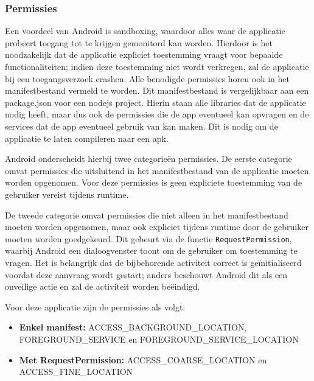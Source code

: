 \subsubsection{Permissies}
Een voordeel van Android is sandboxing, waardoor alles waar de applicatie probeert toegang tot te krijgen gemonitord kan worden. 
Hierdoor is het noodzakelijk dat de applicatie expliciet toestemming vraagt voor bepaalde functionaliteiten; indien deze toestemming niet wordt verkregen, zal de applicatie bij een toegangsverzoek crashen. Alle benodigde permissies horen ook in het manifestbestand vermeld te worden.
Dit manifestbestand is vergelijkbaar aan een package.json voor een nodejs project. Hierin staan alle libraries dat de applicatie nodig heeft, maar dus ook de permissies die de app eventueel kan opvragen en de services dat de app eventueel gebruik van kan maken. Dit is nodig om de applicatie te laten compileren naar een \gls{apk}.

Android onderscheidt hierbij twee categorieën permissies. 
De eerste categorie omvat permissies die uitsluitend in het manifestbestand van de applicatie moeten worden opgenomen. Voor deze permissies is geen expliciete toestemming van de gebruiker vereist tijdens runtime.

De tweede categorie omvat permissies die niet alleen in het manifestbestand moeten worden opgenomen, maar ook expliciet tijdens runtime door de gebruiker moeten worden goedgekeurd. Dit gebeurt via de functie \texttt{RequestPermission}, waarbij Android een dialoogvenster toont om de gebruiker om toestemming te vragen. Het is belangrijk dat de bijbehorende activiteit correct is geïnitialiseerd voordat deze aanvraag wordt gestart; anders beschouwt Android dit als een onveilige actie en zal de activiteit worden beëindigd.

Voor deze applicatie zijn de permissies als volgt:
\begin{itemize}
    \item \textbf{Enkel manifest:} ACCESS\_BACKGROUND\_LOCATION, FOREGROUND\_SERVICE en FOREGROUND\_SERVICE\_LOCATION
    \item \textbf{Met RequestPermission:} ACCESS\_COARSE\_LOCATION en ACCESS\_FINE\_LOCATION
\end{itemize}

